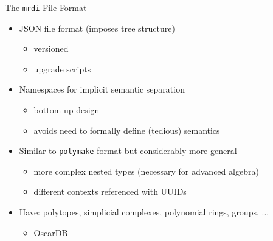 \documentclass[9pt]{beamer}
\theoremstyle{definition}
\begin{document}

\begin{frame}[fragile]{The \texttt{mrdi} File Format}
  \begin{tcolorbox}[]
    \begin{itemize}
      \setlength{\itemsep}{2ex}
    \item JSON file format (imposes tree structure) \begin{itemize}
      \item versioned
      \item upgrade scripts
      \end{itemize}
    \item Namespaces for implicit semantic separation \begin{itemize}
      \item bottom-up design
      \item avoids need to formally define (tedious) semantics
        
      \end{itemize}
    \item Similar to \texttt{polymake} format but considerably more general \begin{itemize}
      \item more complex nested types (necessary for advanced algebra)
      \item different contexts referenced with UUIDs
      \end{itemize}
    \item Have: polytopes, simplicial complexes, polynomial rings, groups, ...\begin{itemize}
      \item OscarDB
      \end{itemize}
    \end{itemize}
  \end{tcolorbox}
\end{frame}


\end{document}
